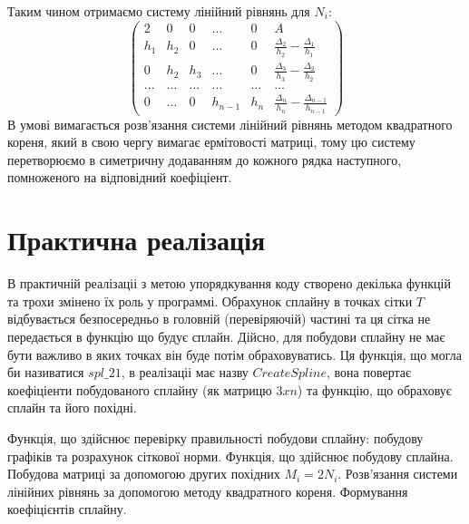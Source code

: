 \documentclass[titlepage]{article}
\newcommand\makelisting[1]{\begingroup\spacing{1} \vspace{1cm} \endgroup}
\newcommand\mysection[1]{\begingroup\center\section*{#1}\endgroup}
\begin{document}
Таким чином отримаємо систему лінійний рівнянь для $N_i$:
\[\left(\begin{array}{ccccc|c}
2 & 0 & 0 & \ldots & 0 & A\\
h_1 & h_2 & 0 & \ldots& 0  & \frac{\Delta_{2}}{h_{2}} - \frac{\Delta_1}{h_1}\\
0 & h_2 & h_3 & \ldots & 0 & \frac{\Delta_{3}}{h_{3}} - \frac{\Delta_2}{h_2}\\
\ldots &\ldots &\ldots &\ldots &\ldots & \ldots\\
0 & \ldots & 0  & h_{n-1} &h_n & \frac{\Delta_{n}}{h_{n}} - \frac{\Delta_{n-1}}{h_{n-1}}
\end{array}\right)\]
В умові вимагається розв'язання системи лінійний рівнянь методом квадратного кореня, який в свою чергу вимагає ермітовості матриці, тому цю систему перетворюємо в симетричну додаванням до кожного рядка наступного, помноженого на відповідний коефіціент.
\mysection{Практична реалізація}
В практичній реалізаціі з метою упорядкування коду створено декілька функцій та трохи змінено їх роль у программі. Обрахунок сплайну в точках сітки $T$ відбувається безпосередньо в головній (перевіряючій) частині та ця сітка не передається в функцію що будує сплайн. Дійсно, для побудови сплайну не має бути важливо в яких точках він буде потім обраховуватись. Ця функція, що могла би називатися $spl\_21$, в реалізаціі має назву $CreateSpline$, вона повертає коефіціенти побудованого сплайну (як матрицю $3xn$) та функцію, що обраховує сплайн та його похідні. 

Функція, що здійснює перевірку правильності побудови сплайну: побудову графіків та розрахунок сіткової норми.
\makelisting{main.m}
Функція, що здійснює побудову сплайна.
\makelisting{CreateSpline.m}
Побудова матриці за допомогою других похідних $M_i = 2N_i$.
\makelisting{CreateSEMatrix.m}
Розв'язання системи лінійних рівнянь за допомогою методу квадратного кореня.
\makelisting{SolveSE.m}
Формування коефіцієнтів сплайну.
\makelisting{FormSpline.m}
\end{document}
